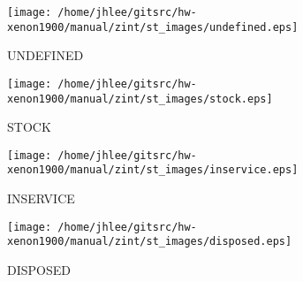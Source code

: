 \noindent
\vspace{1cm}
\begin{minipage}{.2\textwidth}
\begin{center}
\texttt{[image: /home/jhlee/gitsrc/hw-xenon1900/manual/zint/st\_images/undefined.eps]}
\end{center}
\end{minipage}
\begin{minipage}{.7\textwidth}
UNDEFINED
\end{minipage}


\noindent
\vspace{1cm}
\begin{minipage}{.2\textwidth}
\begin{center}
\texttt{[image: /home/jhlee/gitsrc/hw-xenon1900/manual/zint/st\_images/stock.eps]}
\end{center}
\end{minipage}
\begin{minipage}{.7\textwidth}
STOCK
\end{minipage}


\noindent
\vspace{1cm}
\begin{minipage}{.2\textwidth}
\begin{center}
\texttt{[image: /home/jhlee/gitsrc/hw-xenon1900/manual/zint/st\_images/inservice.eps]}
\end{center}
\end{minipage}
\begin{minipage}{.7\textwidth}
INSERVICE
\end{minipage}


\noindent
\vspace{1cm}
\begin{minipage}{.2\textwidth}
\begin{center}
\texttt{[image: /home/jhlee/gitsrc/hw-xenon1900/manual/zint/st\_images/disposed.eps]}
\end{center}
\end{minipage}
\begin{minipage}{.7\textwidth}
DISPOSED
\end{minipage}


